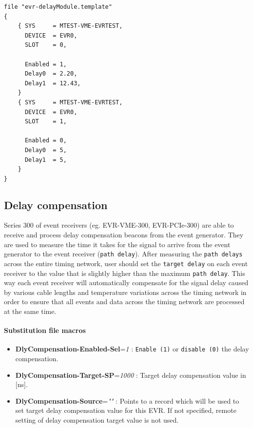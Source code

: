 \documentclass[12pt,a4paper]{article}
\begin{document}
\begin{verbatim}
file "evr-delayModule.template"
{
    { SYS     = MTEST-VME-EVRTEST,
      DEVICE  = EVR0,
      SLOT    = 0,

      Enabled = 1,
      Delay0  = 2.20,
      Delay1  = 12.43,
    }
    { SYS     = MTEST-VME-EVRTEST,
      DEVICE  = EVR0,
      SLOT    = 1,

      Enabled = 0,
      Delay0  = 5,
      Delay1  = 5,
    }
}
\end{verbatim}

\subsection{Delay compensation}\label{sec:Delay compensation}
Series 300 of event receivers (eg. EVR-VME-300, EVR-PCIe-300) are able to receive and process delay compensation beacons from the event generator. They are used to measure the time it takes for the signal to arrive from the event generator to the event receiver (\texttt{path delay}). After measuring the \texttt{path delays} across the entire timing network, user should set the \texttt{target delay} on each event receiver to the value that is slightly higher than the maximum \texttt{path delay}. This way each event receiver will automatically compensate for the signal delay caused by various cable lengths and temperature variations across the timing network in order to ensure that all events and data across the timing network are processed at the same time.

\paragraph{Substitution file macros}
\begin{itemize}
\item
  \textbf{DlyCompensation-Enabled-Sel}=\emph{1} : \texttt{Enable (1)} or \texttt{disable (0)} the delay compensation.
\item 
  \textbf{DlyCompensation-Target-SP}=\emph{1000} : Target delay compensation value in [ns].
\item 
  \textbf{DlyCompensation-Source}=\emph{""} :  Points to a record which will be used to set target delay compensation value for this EVR. If not specified, remote setting of delay compensation target value is not used.
\end{itemize}
\end{document}
